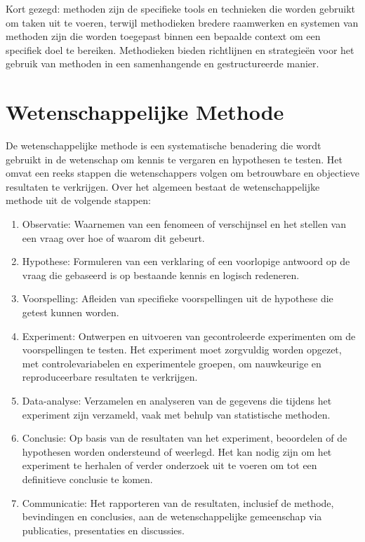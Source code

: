 \documentclass[
  letterpaper,
  DIV=11,
  numbers=noendperiod]{scrreprt}
\providecommand{\tightlist}{%
  \setlength{\itemsep}{0pt}\setlength{\parskip}{0pt}}\usepackage{longtable,booktabs,array}
\begin{document}
Kort gezegd: methoden zijn de specifieke tools en technieken die worden
gebruikt om taken uit te voeren, terwijl methodieken bredere raamwerken
en systemen van methoden zijn die worden toegepast binnen een bepaalde
context om een specifiek doel te bereiken. Methodieken bieden
richtlijnen en strategieën voor het gebruik van methoden in een
samenhangende en gestructureerde manier.

\hypertarget{wetenschappelijke-methode}{%
\section{Wetenschappelijke Methode}\label{wetenschappelijke-methode}}

De wetenschappelijke methode is een systematische benadering die wordt
gebruikt in de wetenschap om kennis te vergaren en hypothesen te testen.
Het omvat een reeks stappen die wetenschappers volgen om betrouwbare en
objectieve resultaten te verkrijgen. Over het algemeen bestaat de
wetenschappelijke methode uit de volgende stappen:

\begin{enumerate}
\def\labelenumi{\arabic{enumi}.}
\tightlist
\item
  Observatie: Waarnemen van een fenomeen of verschijnsel en het stellen
  van een vraag over hoe of waarom dit gebeurt.
\item
  Hypothese: Formuleren van een verklaring of een voorlopige antwoord op
  de vraag die gebaseerd is op bestaande kennis en logisch redeneren.
\item
  Voorspelling: Afleiden van specifieke voorspellingen uit de hypothese
  die getest kunnen worden.
\item
  Experiment: Ontwerpen en uitvoeren van gecontroleerde experimenten om
  de voorspellingen te testen. Het experiment moet zorgvuldig worden
  opgezet, met controlevariabelen en experimentele groepen, om
  nauwkeurige en reproduceerbare resultaten te verkrijgen.
\item
  Data-analyse: Verzamelen en analyseren van de gegevens die tijdens het
  experiment zijn verzameld, vaak met behulp van statistische methoden.
\item
  Conclusie: Op basis van de resultaten van het experiment, beoordelen
  of de hypothesen worden ondersteund of weerlegd. Het kan nodig zijn om
  het experiment te herhalen of verder onderzoek uit te voeren om tot
  een definitieve conclusie te komen.
\item
  Communicatie: Het rapporteren van de resultaten, inclusief de methode,
  bevindingen en conclusies, aan de wetenschappelijke gemeenschap via
  publicaties, presentaties en discussies.
\end{enumerate}
\end{document}
